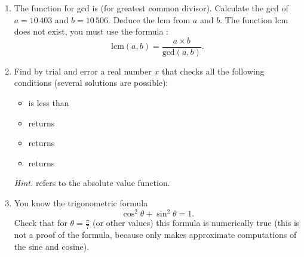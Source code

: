 \documentclass[11pt,class=report,crop=false]{standalone}
\begin{document}
\begin{activite}


\begin{enumerate}
  \item The function \Python{} for gcd is  (for greatest common divisor). Calculate the gcd of $a = 10\,403$ and $b = 10\,506$. Deduce the lcm from $a$ and $b$. The function lcm does not exist, you must use the formula :
  $$\text{lcm}(a,b) = \frac{a \times b}{\text{gcd}(a,b)}.$$
  
  \item Find by trial and error a real number $x$ that checks all the following conditions (several solutions are possible):
  \begin{itemize}
    \item {} is less than 
    \item {} returns 
    \item {} returns 
    \item {} returns  
  \end{itemize}
 
  \emph{Hint.}  refers to the absolute value function.
  
  \item You know the trigonometric formula 
  $$\cos^2 \theta + \sin^2 \theta = 1.$$
  Check that for $\theta = \frac\pi7$ (or other values) this formula is numerically true (this is not a proof of the formula, because \Python{} only makes approximate computations of the sine and cosine).
\end{enumerate}  
\end{activite}

\end{document}
